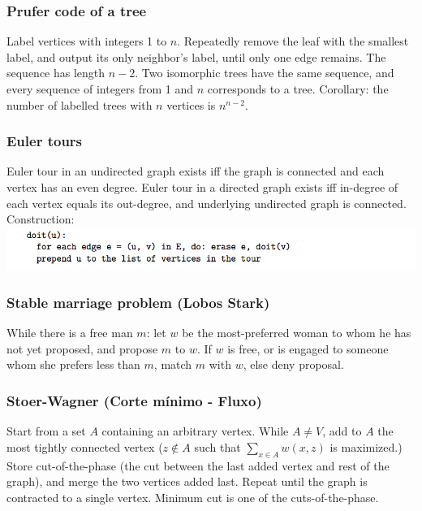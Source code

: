 \documentclass[a4paper,12pt]{article}
\begin{document}
\subsubsection{Prufer code of a tree}
Label vertices with integers 1 to $n$. Repeatedly remove the leaf with the smallest label, and output its only neighbor’s label, until only one edge remains. The sequence has length $n - 2$.
Two isomorphic trees have the same sequence, and every sequence of integers from 1 and $n$ corresponds to a tree. Corollary: the number of labelled trees with $n$ vertices is $n^{n-2}$.

\subsubsection{Euler tours}
Euler tour in an undirected graph exists iff the graph is connected and each vertex has an even degree. Euler tour in a directed graph exists iff in-degree of each vertex equals its out-degree, and underlying undirected graph is connected.
Construction:\\
\includegraphics[scale=.7]{graph/euler}

\newpage
\subsubsection{Stable marriage problem (Lobos Stark)}
While there is a free man $m$: let $w$ be the most-preferred woman to whom he has not yet proposed, and propose $m$ to $w$. If $w$ is free, or is engaged to someone whom she prefers less than $m$, match $m$ with $w$, else deny proposal.
\begin{multicols}{2}
  
\end{multicols}

\newpage
\subsubsection{Stoer-Wagner (Corte mínimo - Fluxo)}
Start from a set $A$ containing an arbitrary vertex. While $A \neq V$, add to $A$ the most tightly connected vertex ($z \not\in A$ such that $\sum_{x\in A}w(x,z)$ is maximized.)
Store cut-of-the-phase (the cut between the last added vertex and rest of the graph), and merge the two vertices added last. Repeat until the graph is contracted to a single vertex. Minimum cut is one of the cuts-of-the-phase.
\begin{multicols}{2}
  
\end{multicols}
\end{document}
